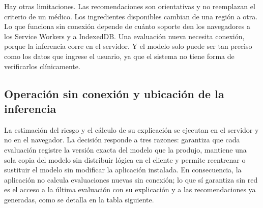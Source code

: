 \documentclass[conference]{IEEEtran}
\begin{document}
Hay otras limitaciones. Las recomendaciones son orientativas y no reemplazan el criterio de un médico. Los ingredientes disponibles cambian de una región a otra. Lo que funciona sin conexión depende de cuánto soporte den los navegadores a los Service Workers y a IndexedDB. Una evaluación nueva necesita conexión, porque la inferencia corre en el servidor. Y el modelo solo puede ser tan preciso como los datos que ingrese el usuario, ya que el sistema no tiene forma de verificarlos clínicamente.

\subsection{Operación sin conexión y ubicación de la inferencia}
La estimación del riesgo y el cálculo de su explicación se ejecutan en el servidor y no en el navegador. La decisión responde a tres razones: garantiza que cada evaluación registre la versión exacta del modelo que la produjo, mantiene una sola copia del modelo sin distribuir lógica en el cliente y permite reentrenar o sustituir el modelo sin modificar la aplicación instalada. En consecuencia, la aplicación no calcula evaluaciones nuevas sin conexión; lo que sí garantiza sin red es el acceso a la última evaluación con su explicación y a las recomendaciones ya generadas, como se detalla en la tabla siguiente.
\end{document}
